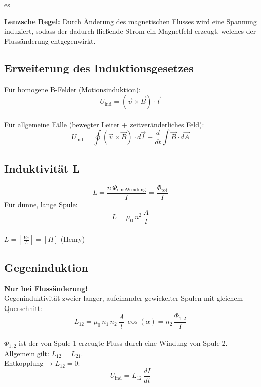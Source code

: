 es\documentclass[a4paper, fontsize=8pt, landscape]{scrartcl}
\newcommand{\hl}[1]{\underline{\textbf{#1}}}
\begin{document}
\begin{multicols*}{4}
    \hl{Lenzsche Regel:}
    Durch Änderung des magnetischen Flusses wird eine Spannung induziert, sodass der dadurch fließende Strom ein Magnetfeld erzeugt, welches der Flussänderung entgegenwirkt.

\subsection{Erweiterung des Induktionsgesetzes}
    Für homogene B-Felder (Motionsinduktion):\\
    \[
    U_{\text{ind}} = (\vec{v} \times \vec{B}) \cdot \vec{l}
    \]\\
    
    Für allgemeine Fälle (bewegter Leiter + zeitveränderliches Feld):\\
    \[
    U_{\text{ind}} = \oint (\vec{v} \times \vec{B}) \cdot d\vec{l} - \frac{d}{dt} \int \vec{B} \cdot d\vec{A}
    \]

\subsection{Induktivität L}
    \[L = \frac{n\,\Phi_{\text{eineWindung}}}{I} = \frac{\Phi_{\text{tot}}}{I}\]
    Für dünne, lange Spule:
    \[L = \mu_0\,n^2\,\frac{A}{l}\]\\
    $L = [\frac{Vs}{A}]=[H]$ (Henry)

\subsection{Gegeninduktion}
    \hl{Nur bei Flussänderung!}\\
    Gegeninduktivität zweier langer, aufeinander gewickelter Spulen mit gleichem Querschnitt:
    \[L_{12} = \mu_0\,n_1\,n_2\,\frac{A}{l}\,\cos(\alpha) = n_2\,\frac{\Phi_{1,2}}{I}\]\\
     \( \Phi_{1,2} \) ist der von Spule 1 erzeugte Fluss durch eine Windung von Spule 2. \\

    Allgemein gilt: $L_{12} = L_{21}$. \\
    Entkopplung → $L_{12} = 0$:
    \[U_{\text{ind}} = L_{12} \,\frac{dI}{dt}\]


\end{multicols*}
\end{document}
